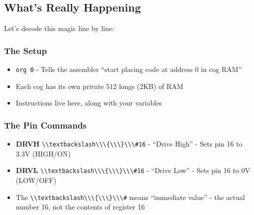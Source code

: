 \documentclass[11pt]{book}
\providecommand{\tightlist}{%
  \setlength{\itemsep}{0pt}\setlength{\parskip}{0pt}}
\providecommand{\passthrough}[1]{#1}
\begin{document}
\hypertarget{whats-really-happening}{%
\subsection{What's Really Happening}\label{whats-really-happening}}

Let's decode this magic line by line:

\hypertarget{the-setup}{%
\subsubsection{The Setup}\label{the-setup}}

\begin{itemize}
\tightlist
\item
  \passthrough{\lstinline!org 0!} - Tells the assembler ``start placing
  code at address 0 in cog RAM''
\item
  Each cog has its own private 512 longs (2KB) of RAM
\item
  Instructions live here, along with your variables
\end{itemize}

\hypertarget{the-pin-commands}{%
\subsubsection{The Pin Commands}\label{the-pin-commands}}

\begin{itemize}
\tightlist
\item
  \textbf{DRVH} \passthrough{\lstinline!\\textbackslash\\\{\\\}\\\#16!}
  - ``Drive High'' - Sets pin 16 to 3.3V (HIGH/ON)
\item
  \textbf{DRVL} \passthrough{\lstinline!\\textbackslash\\\{\\\}\\\#16!}
  - ``Drive Low'' - Sets pin 16 to 0V (LOW/OFF)
\item
  The \passthrough{\lstinline!\\textbackslash\\\{\\\}\\\#!} means
  ``immediate value'' - the actual number 16, not the contents of
  register 16
\end{itemize}
\end{document}
